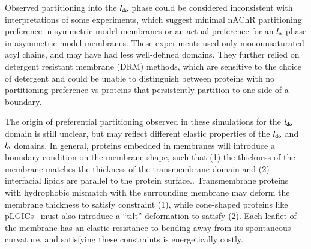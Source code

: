 Observed partitioning into the $l_{\mathrm{do}}$ phase could be considered inconsistent with interpretations of some experiments, \cite{Bermdez_Partition_2010,Perillo_Transbilayer_2016}	which suggest minimal nAChR partitioning preference in symmetric model membranes or an actual preference for an $l_{\mathrm{o}}$ phase in asymmetric model membranes.  These experiments used only monounsaturated acyl chains, and may have had less well-defined domains.  They further relied on detergent resistant membrane (DRM) methods, which are sensitive to {the} choice of detergent \cite{Brown2007} and could be unable to distinguish between proteins with no partitioning preference vs proteins that persistently partition to one side of a boundary. 


	
The origin of preferential partitioning observed in these simulations for the $l_{\mathrm{do}}$ domain is still unclear, but may reflect different elastic properties of the $l_{\mathrm{do}}$ and $l_{\mathrm{o}}$ domains.  In general, proteins embedded in membranes will introduce a boundary condition on the membrane shape, such that (1) the thickness of the membrane matches the thickness of the transmembrane domain\cite{Aranda-Espinoza1996, Jensen2004, Brannigan2006} and (2) interfacial lipids are parallel to the protein surface.\cite{goulian1993}.  Transmembrane proteins with hydrophobic mismatch with the surrounding membrane may deform the membrane thickness to satisfy constraint (1), while cone-shaped proteins like pLGICs~ must also introduce a ``tilt'' deformation to satisfy (2).  Each leaflet of the membrane has an elastic resistance to bending away from its spontaneous curvature, and satisfying these constraints is energetically costly.  

